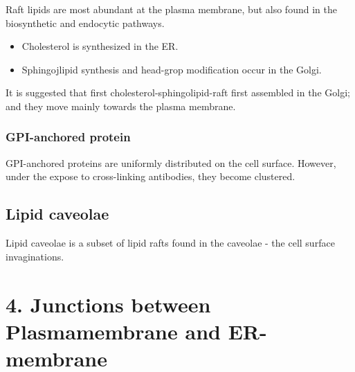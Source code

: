 Raft lipids are most abundant at the plasma membrane, but also found in the biosynthetic and endocytic pathways. 
\begin{itemize}
\item 	Cholesterol is synthesized in the ER.
\item	Sphingojlipid synthesis and head-grop modification occur in the Golgi.
\end{itemize}
It is suggested that first cholesterol-sphingolipid-raft first
assembled in the Golgi; and they move mainly towards the plasma
membrane.

\subsubsection{GPI-anchored protein}
\label{sec:gpi-anchored-protein}

GPI-anchored proteins are uniformly distributed on the cell
surface. However, under the expose to cross-linking antibodies, they
become clustered. 


\subsection{Lipid caveolae}
\label{sec:lipid-caveolae}

Lipid caveolae is a subset of lipid rafts found in the caveolae  - the
cell surface invaginations.

\section{4. Junctions between Plasmamembrane and ER-membrane}
\label{sec:junction-ER-plasmamembrane}
\label{sec:junction-plasmamembrane-ER}

